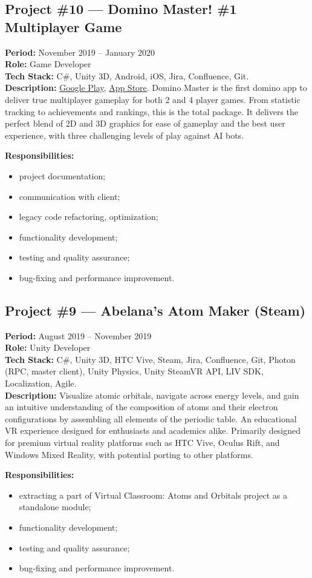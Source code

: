 \documentclass[letterpaper,11pt]{article}
\newcommand{\project}[6]{%
  \par\addvspace{20pt}%
  \noindent\begin{minipage}{\linewidth}
  \subsection*{#1}
  \textbf{Period:} #2 \\
  \textbf{Role:} #5 \\
  \textbf{Tech Stack:} #4 \\
  \textbf{Description:} #3
  \par\smallskip
  \textbf{Responsibilities:}
  \begin{itemize}[leftmargin=1.4em,itemsep=1pt,topsep=2pt,parsep=0pt]
    #6
  \end{itemize}
  \end{minipage}%
  \par\addvspace{20pt}%
}
\begin{document}
\project{Project \#10 --- Domino Master! \#1 Multiplayer Game}
  {November 2019 -- January 2020}
  {\href{https://play.google.com/store/apps/details?id=com.TikGames.DominoMaster}{Google Play}, \href{https://apps.apple.com/us/app/domino-master/id1154039096}{App Store}. Domino Master is the first domino app to deliver true multiplayer gameplay for both 2 and 4 player games. From statistic tracking to achievements and rankings, this is the total package. It delivers the perfect blend of 2D and 3D graphics for ease of gameplay and the best user experience, with three challenging levels of play against AI bots.}
  {C\#, Unity 3D, Android, iOS, Jira, Confluence, Git.}
  {Game Developer}
  {
    \item project documentation;
    \item communication with client;
    \item legacy code refactoring, optimization;
    \item functionality development;
    \item testing and quality assurance;
    \item bug-fixing and performance improvement.
  }

\project{Project \#9 --- Abelana's Atom Maker (Steam)}
  {August 2019 -- November 2019}
  {Visualize atomic orbitals, navigate across energy levels, and gain an intuitive understanding of the composition of atoms and their electron configurations by assembling all elements of the periodic table. An educational VR experience designed for enthusiasts and academics alike. Primarily designed for premium virtual reality platforms such as HTC Vive, Oculus Rift, and Windows Mixed Reality, with potential porting to other platforms.}
  {C\#, Unity 3D, HTC Vive, Steam, Jira, Confluence, Git, Photon (RPC, master client), Unity Physics, Unity SteamVR API, LIV SDK, Localization, Agile.}
  {Unity Developer}
  {
    \item extracting a part of Virtual Classroom: Atoms and Orbitals project as a standalone module;
    \item functionality development;
    \item testing and quality assurance;
    \item bug-fixing and performance improvement.
  }
\end{document}
